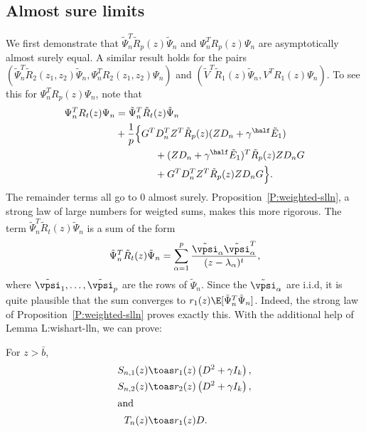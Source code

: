 \subsection{Almost sure limits}

We first demonstrate that $\tilde \Psi_n^T \tilde R_p(z) \tilde \Psi_n$ and 
$\Psi_n^T R_p (z) \Psi_n$ are asymptotically almost surely
equal. A similar result holds for the pairs 
$(\tilde \Psi_n^T \tilde R_2(z_1, z_2) \tilde \Psi_n,
  \Psi_n^T R_2(z_1, z_2) \Psi_n)$
and $(\tilde V^T \tilde R_1(z) \tilde \Psi_n, V^T R_1(z) \Psi_n)$.
To see this for $\Psi_n^T R_p(z) \Psi_n$, note that
\begin{align*}
    \begin{split}
    \Psi_n^T R_t (z) \Psi_n
    &=
    \tilde \Psi_n^T \tilde R_t(z) \tilde \Psi_n \\
        &+ \frac{1}{p} \Big\{
        G^T D_n^T Z^T \tilde R_p(z) ( Z D_n + \gamma^\half \tilde E_1) \\
        &\qquad \qquad +
        ( Z D_n + \gamma^\half \tilde E_1)^T \tilde R_p(z) Z D_n G \\
        &\qquad \qquad +
        G^T D_n^T Z^T \tilde R_p(z) Z D_n G
        \Big\}.
    \end{split}
\end{align*}
The remainder terms all go to $0$ almost surely.
Proposition~\ref{P:weighted-slln}, a strong law of large numbers for weigted sums,
makes this more rigorous.  The term 
$\tilde \Psi_n^T \tilde R_t(z) \tilde \Psi_n$ is a sum of the form
\[
    \tilde \Psi_n^T \tilde R_t(z) \tilde \Psi_n 
    =
    \sum_{\alpha=1}^p
        \frac{\tilde \vpsi_\alpha \tilde \vpsi^T_\alpha }
             {(z - \lambda_\alpha)^t},
\]
where $\tilde \vpsi_1, \ldots, \tilde \vpsi_p$ are the rows of $\tilde \Psi_n$.
Since the $\tilde \vpsi_\alpha$ are i.i.d, it is quite plausible that the sum
converges to $r_1(z) \E[ \tilde \Psi_n^T \tilde \Psi_n ]$.  Indeed, the strong
law of Proposition~\ref{P:weighted-slln} proves exactly this.  With the additional
help of Lemma {L:wishart-lln}, we can prove:

\begin{lemma}\label{L:Sbar}
    For $z > \bar b$, 
    \begin{align*}
        S_{n,1}(z) &\toas r_1(z) \left( D^2 + \gamma I_k \right), \\
        S_{n,2}(z) &\toas r_2(z) \left( D^2 + \gamma I_k \right), \\
    \intertext{and}
        T_n(z) &\toas r_1(z) D.
    \end{align*}
\end{lemma}

